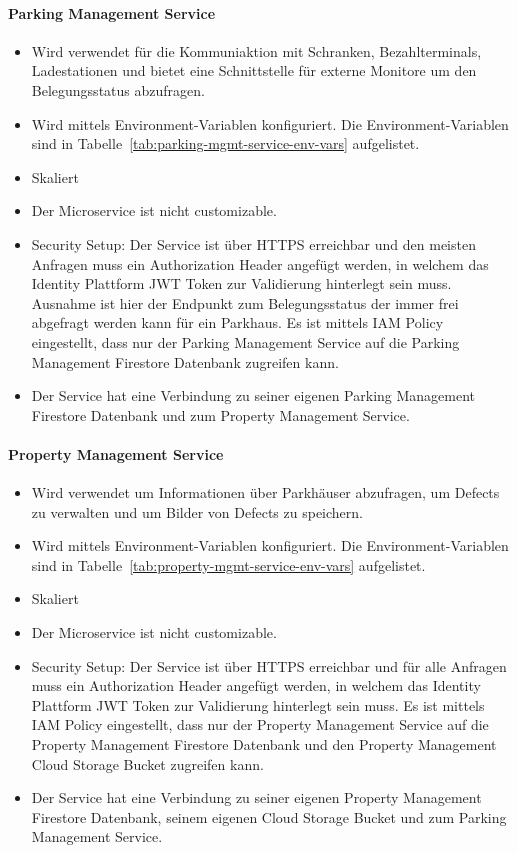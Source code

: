 \paragraph{Parking Management Service}
\begin{itemize}
	\item Wird verwendet für die Kommuniaktion mit Schranken, Bezahlterminals, Ladestationen und bietet eine Schnittstelle für externe Monitore um den Belegungsstatus abzufragen.
	\item Wird mittels Environment-Variablen konfiguriert. Die Environment-Variablen sind in Tabelle~\ref{tab:parking-mgmt-service-env-vars} aufgelistet.
	\item Skaliert %
	\item Der Microservice ist nicht customizable.
	\item Security Setup: Der Service ist über HTTPS erreichbar und den meisten Anfragen muss ein Authorization Header angefügt werden, in welchem das Identity Plattform JWT Token zur Validierung hinterlegt sein muss. Ausnahme ist hier der Endpunkt zum Belegungsstatus der immer frei abgefragt werden kann für ein Parkhaus. Es ist mittels IAM Policy eingestellt, dass nur der Parking Management Service auf die Parking Management Firestore Datenbank zugreifen kann.
	\item Der Service hat eine Verbindung zu seiner eigenen Parking Management Firestore Datenbank und zum Property Management Service.
\end{itemize}

\paragraph{Property Management Service}
\begin{itemize}
	\item Wird verwendet um Informationen über Parkhäuser abzufragen, um Defects zu verwalten und um Bilder von Defects zu speichern.
	\item Wird mittels Environment-Variablen konfiguriert. Die Environment-Variablen sind in Tabelle~\ref{tab:property-mgmt-service-env-vars} aufgelistet.
	\item Skaliert %
	\item Der Microservice ist nicht customizable.
	\item Security Setup: Der Service ist über HTTPS erreichbar und für alle Anfragen muss ein Authorization Header angefügt werden, in welchem das Identity Plattform JWT Token zur Validierung hinterlegt sein muss. Es ist mittels IAM Policy eingestellt, dass nur der Property Management Service auf die Property Management Firestore Datenbank und den Property Management Cloud Storage Bucket zugreifen kann.
	\item Der Service hat eine Verbindung zu seiner eigenen Property Management Firestore Datenbank, seinem eigenen Cloud Storage Bucket und zum Parking Management Service.
\end{itemize}

